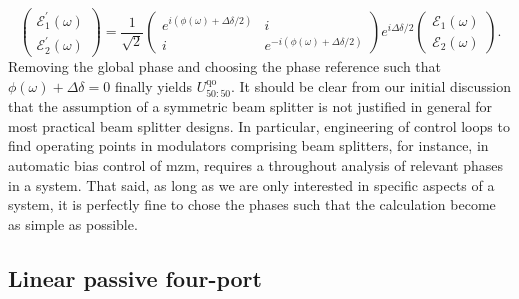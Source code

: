 \begin{equation}
    \begin{pmatrix}
        \mathcal{E}_1^\prime(\omega)
        \\
        \mathcal{E}_2^\prime(\omega)
    \end{pmatrix}
    =
    \frac{1}{\sqrt{2}}
    \begin{pmatrix}
        e^{i(\phi(\omega)+\Delta\delta/2)} & i
        \\
        i & e^{-i(\phi(\omega)+\Delta\delta/2)}
    \end{pmatrix}
    e^{i\Delta\delta/2}
    \begin{pmatrix}
        \mathcal{E}_1(\omega)
        \\
        \mathcal{E}_2(\omega)
    \end{pmatrix}
    .
\end{equation}
Removing the global phase and choosing the phase reference such that $\phi(\omega)+\Delta\delta=0$ finally yields $U_{50:50}^\text{qo}$.
It should be clear from our initial discussion that the assumption of a symmetric beam splitter is not justified in general for most practical beam splitter designs.
In particular, engineering of control loops to find operating points in modulators comprising beam splitters, for instance, in automatic bias control of \gls{mzm}, requires a throughout analysis of relevant phases in a system.
That said, as long as we are only interested in specific aspects of a system, it is perfectly fine to chose the phases such that the calculation become as simple as possible.

\FloatBarrier
\subsection{Linear passive four-port}


